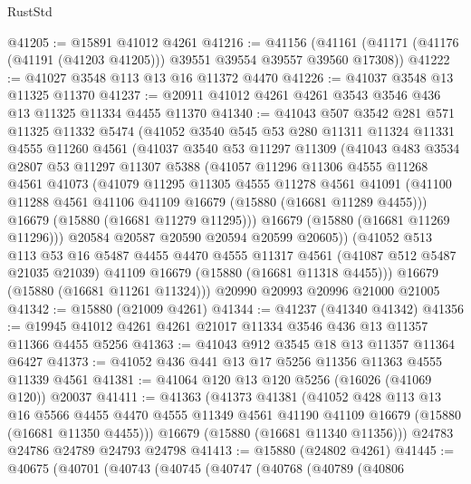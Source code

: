 \begin{lexlean}{RustStd}
\begin{coremodule}
@41205 := @15891 @41012 @4261
@41216 := @41156
    (@41161 (@41171 (@41176 (@41191 (@41203 @41205))) @39551 @39554 @39557 @39560 @17308))
@41222 := @41027 @3548 @113 @13 @16 @11372 @4470
@41226 := @41037 @3548 @13 @11325 @11370
@41237 := @20911 @41012 @4261 @4261 @3543 @3546 @436 @13 @11325 @11334 @4455 @11370
@41340 := @41043
    @507
    @3542
    @281
    @571
    @11325
    @11332
    @5474
    (@41052
      @3540
      @545
      @53
      @280
      @11311
      @11324
      @11331
      @4555
      @11260
      @4561
      (@41037
        @3540
        @53
        @11297
        @11309
        (@41043
          @483
          @3534
          @2807
          @53
          @11297
          @11307
          @5388
          (@41057
            @11296
            @11306
            @4555
            @11268
            @4561
            @41073
            (@41079
              @11295
              @11305
              @4555
              @11278
              @4561
              @41091
              (@41100 @11288 @4561 @41106 @41109 @16679 (@15880 (@16681 @11289 @4455)))
              @16679
              (@15880 (@16681 @11279 @11295)))
            @16679
            (@15880 (@16681 @11269 @11296)))
          @20584
          @20587
          @20590
          @20594
          @20599
          @20605))
      (@41052
        @513
        @113
        @53
        @16
        @5487
        @4455
        @4470
        @4555
        @11317
        @4561
        (@41087 @512 @5487 @21035 @21039)
        @41109
        @16679
        (@15880 (@16681 @11318 @4455)))
      @16679
      (@15880 (@16681 @11261 @11324)))
    @20990
    @20993
    @20996
    @21000
    @21005
@41342 := @15880 (@21009 @4261)
@41344 := @41237 (@41340 @41342)
@41356 := @19945 @41012 @4261 @4261 @21017 @11334 @3546 @436 @13 @11357 @11366 @4455 @5256
@41363 := @41043 @912 @3545 @18 @13 @11357 @11364 @6427
@41373 := @41052 @436 @441 @13 @17 @5256 @11356 @11363 @4555 @11339 @4561
@41381 := @41064 @120 @13 @120 @5256 (@16026 (@41069 @120)) @20037
@41411 := @41363
    (@41373
      @41381
      (@41052
        @428
        @113
        @13
        @16
        @5566
        @4455
        @4470
        @4555
        @11349
        @4561
        @41190
        @41109
        @16679
        (@15880 (@16681 @11350 @4455)))
      @16679
      (@15880 (@16681 @11340 @11356)))
    @24783
    @24786
    @24789
    @24793
    @24798
@41413 := @15880 (@24802 @4261)
@41445 := @40675
    (@40701
      (@40743
        (@40745
          (@40747
            (@40768
              (@40789
                (@40806

\end{coremodule}
\end{lexlean}
